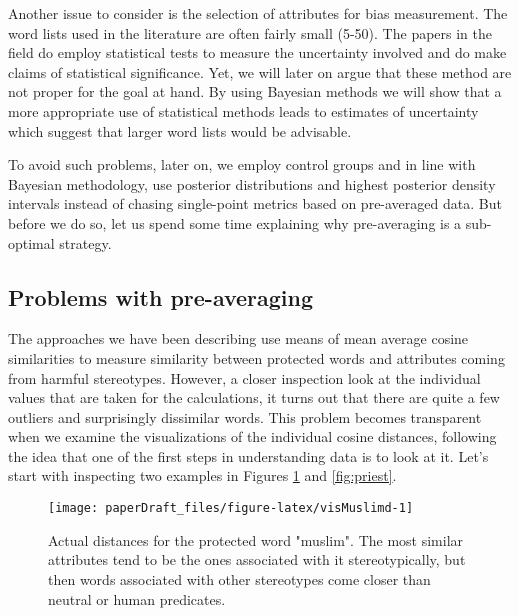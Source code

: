 \documentclass[
  12pt,
  dvipsnames,enabledeprecatedfontcommands]{scrartcl}
\begin{document}
Another issue to consider is the selection of attributes for bias
measurement. The word lists used in the literature are often fairly
small (5-50). The papers in the field do employ statistical tests to
measure the uncertainty involved and do make claims of statistical
significance. Yet, we will later on argue that these method are not
proper for the goal at hand. By using Bayesian methods we will show that
a more appropriate use of statistical methods leads to estimates of
uncertainty which suggest that larger word lists would be advisable.

To avoid such problems, later on, we employ control groups and in line
with Bayesian methodology, use posterior distributions and highest
posterior density intervals instead of chasing single-point metrics
based on pre-averaged data. But before we do so, let us spend some time
explaining why pre-averaging is a sub-optimal strategy.

\hypertarget{problems-with-pre-averaging}{%
\subsection{Problems with
pre-averaging}\label{problems-with-pre-averaging}}

\label{subsec:problems}

The approaches we have been describing use means of mean average cosine
similarities to measure similarity between protected words and
attributes coming from harmful stereotypes. However, a closer inspection
look at the individual values that are taken for the calculations, it
turns out that there are quite a few outliers and surprisingly
dissimilar words. This problem becomes transparent when we examine the
visualizations of the individual cosine distances, following the idea
that one of the first steps in understanding data is to look at it.
Let's start with inspecting two examples in Figures \ref{fig:muslim} and
\ref{fig:priest}.

\begin{figure}[H]

\begin{center}\texttt{[image: paperDraft\_files/figure-latex/visMuslimd-1]} \end{center}
\caption{Actual distances for the protected word "muslim". The most similar attributes tend to be the ones associated with it stereotypically, but then words associated with other stereotypes come closer than neutral or human predicates. }
\label{fig:muslim}
\end{figure}
\end{document}
